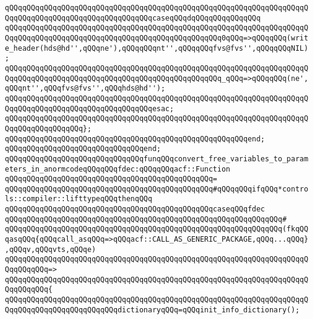 \newline
\verb|qQQqqQQqqQQqqQQqqQQqqQQqqQQqqQQqqQQqqQQqqQQqqQQqqQQqqQQqqQQqqQQqqQQqqQQqqQQqqQQqqQQqqQQqqQQqqQQqqQQqqQQqcaseqQQqdqQQqqQQqqQQqqQQq|\newline
\verb|qQQqqQQqqQQqqQQqqQQqqQQqqQQqqQQqqQQqqQQqqQQqqQQqqQQqqQQqqQQqqQQqqQQqqQQqqQQqqQQqqQQqqQQqqQQqqQQqqQQqqQQqqQQqqQQqqQQqqQQq0qQQq=>qQQqqQQq(write_header(hds@hd'',qQQqne'),qQQqqQQqnt'',qQQqqQQqfvs@fvs'',qQQqqQQqNIL);|\newline
\verb|qQQqqQQqqQQqqQQqqQQqqQQqqQQqqQQqqQQqqQQqqQQqqQQqqQQqqQQqqQQqqQQqqQQqqQQqqQQqqQQqqQQqqQQqqQQqqQQqqQQqqQQqqQQqqQQqqQQqqQQq_qQQq=>qQQqqQQq(ne',qQQqnt'',qQQqfvs@fvs'',qQQqhds@hd'');|\newline
\verb|qQQqqQQqqQQqqQQqqQQqqQQqqQQqqQQqqQQqqQQqqQQqqQQqqQQqqQQqqQQqqQQqqQQqqQQqqQQqqQQqqQQqqQQqqQQqqQQqqQQqqQQqesac;|\newline
\verb|qQQqqQQqqQQqqQQqqQQqqQQqqQQqqQQqqQQqqQQqqQQqqQQqqQQqqQQqqQQqqQQqqQQqqQQqqQQqqQQqqQQqqQQq};|\newline
\verb|qQQqqQQqqQQqqQQqqQQqqQQqqQQqqQQqqQQqqQQqqQQqqQQqqQQqqQQqend;|\newline
\verb|qQQqqQQqqQQqqQQqqQQqqQQqqQQqqQQqend;|\newline
\newline
\newline
\verb|qQQqqQQqqQQqqQQqqQQqqQQqqQQqqQQqfunqQQqconvert_free_variables_to_parameters_in_anormcodeqQQqqQQqfdec:qQQqqQQqacf::Function|\newline
\verb|qQQqqQQqqQQqqQQqqQQqqQQqqQQqqQQqqQQqqQQqqQQqqQQq=|\newline
\verb|qQQqqQQqqQQqqQQqqQQqqQQqqQQqqQQqqQQqqQQqqQQqqQQq#qQQqqQQqifqQQq*controls::compiler::lifttypeqQQqthenqQQq|\newline
\verb|qQQqqQQqqQQqqQQqqQQqqQQqqQQqqQQqqQQqqQQqqQQqqQQqcaseqQQqfdec|\newline
\verb|qQQqqQQqqQQqqQQqqQQqqQQqqQQqqQQqqQQqqQQqqQQqqQQqqQQqqQQqqQQqqQQq#|\newline
\verb|qQQqqQQqqQQqqQQqqQQqqQQqqQQqqQQqqQQqqQQqqQQqqQQqqQQqqQQqqQQqqQQq(fkqQQqasqQQq{qQQqcall_asqQQq=>qQQqacf::CALL_AS_GENERIC_PACKAGE,qQQq...qQQq},qQQqv,qQQqvts,qQQqe)|\newline
\verb|qQQqqQQqqQQqqQQqqQQqqQQqqQQqqQQqqQQqqQQqqQQqqQQqqQQqqQQqqQQqqQQqqQQqqQQqqQQqqQQq=>|\newline
\verb|qQQqqQQqqQQqqQQqqQQqqQQqqQQqqQQqqQQqqQQqqQQqqQQqqQQqqQQqqQQqqQQqqQQqqQQqqQQqqQQq{|\newline
\verb|qQQqqQQqqQQqqQQqqQQqqQQqqQQqqQQqqQQqqQQqqQQqqQQqqQQqqQQqqQQqqQQqqQQqqQQqqQQqqQQqqQQqqQQqqQQqqQQqdictionaryqQQq=qQQqinit_info_dictionary();|\newline
